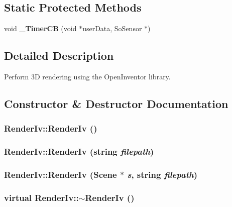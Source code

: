 \subsection*{Static Protected Methods}
\begin{CompactItemize}
\item 
void {\bf \_\-Timer\-CB} (void $\ast$user\-Data, So\-Sensor $\ast$)
\end{CompactItemize}


\subsection{Detailed Description}
Perform 3D rendering using the Open\-Inventor library.



\subsection{Constructor \& Destructor Documentation}
\subsubsection{\setlength{\rightskip}{0pt plus 5cm}Render\-Iv::Render\-Iv ()}\label{class_RenderIv_a0}


\subsubsection{\setlength{\rightskip}{0pt plus 5cm}Render\-Iv::Render\-Iv (string {\em filepath})}\label{class_RenderIv_a1}


\subsubsection{\setlength{\rightskip}{0pt plus 5cm}Render\-Iv::Render\-Iv ({\bf Scene} $\ast$ {\em s}, string {\em filepath})}\label{class_RenderIv_a2}


\subsubsection{\setlength{\rightskip}{0pt plus 5cm}virtual Render\-Iv::$\sim$Render\-Iv ()\hspace{0.3cm}{\tt  [virtual]}}\label{class_RenderIv_a3}




